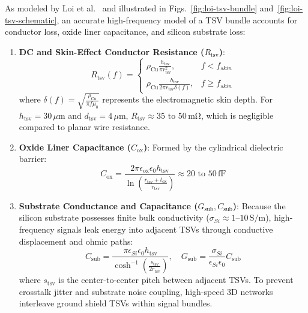 As modeled by Loi et al.~\cite{Loi2011} and illustrated in Figs.~\ref{fig:loi-tsv-bundle} and~\ref{fig:loi-tsv-schematic}, an accurate high-frequency model of a TSV bundle accounts for conductor loss, oxide liner capacitance, and silicon substrate loss:
\begin{enumerate}
    \item \textbf{DC and Skin-Effect Conductor Resistance ($R_{\mathrm{tsv}}$)}:
    \begin{equation}
        R_{\mathrm{tsv}}(f) = 
        \begin{cases}
        \rho_{\mathrm{Cu}} \frac{h_{\mathrm{tsv}}}{\pi r_{\mathrm{tsv}}^2}, & f < f_{skin} \\
        \rho_{\mathrm{Cu}} \frac{h_{\mathrm{tsv}}}{2\pi r_{\mathrm{tsv}} \delta(f)}, & f \ge f_{skin}
        \end{cases}
        \label{eq:tsv-resistance}
    \end{equation}
    where $\delta(f) = \sqrt{\frac{\rho_{\mathrm{Cu}}}{\pi f \mu_0}}$ represents the electromagnetic skin depth. For $h_{\mathrm{tsv}} = 30\,\mu\mathrm{m}$ and $d_{\mathrm{tsv}} = 4\,\mu\mathrm{m}$, $R_{\mathrm{tsv}} \approx 35\text{ to }50\,\mathrm{m\Omega}$, which is negligible compared to planar wire resistance.
    
    \item \textbf{Oxide Liner Capacitance ($C_{\mathrm{ox}}$)}: Formed by the cylindrical dielectric barrier:
    \begin{equation}
        C_{\mathrm{ox}} = \frac{2 \pi \epsilon_{\mathrm{ox}} \epsilon_0 h_{\mathrm{tsv}}}{\ln\left(\frac{r_{\mathrm{tsv}} + t_{\mathrm{ox}}}{r_{\mathrm{tsv}}}\right)} \approx 20\text{ to }50\,\mathrm{fF}
        \label{eq:tsv-capacitance}
    \end{equation}
    
    \item \textbf{Substrate Conductance and Capacitance ($G_{\mathrm{sub}}, C_{\mathrm{sub}}$)}: Because the silicon substrate possesses finite bulk conductivity ($\sigma_{Si} \approx 1\text{--}10\,\text{S/m}$), high-frequency signals leak energy into adjacent TSVs through conductive displacement and ohmic paths:
    \begin{equation}
    C_{\mathrm{sub}} = \frac{\pi \epsilon_{Si} \epsilon_0 h_{\mathrm{tsv}}}{\cosh^{-1}\left(\frac{s_{\mathrm{tsv}}}{2 r_{\mathrm{tsv}}}\right)}, \quad G_{\mathrm{sub}} = \frac{\sigma_{Si}}{\epsilon_{Si} \epsilon_0} C_{\mathrm{sub}}
    \label{eq:tsv_sub_coupling}
    \end{equation}
    where $s_{\mathrm{tsv}}$ is the center-to-center pitch between adjacent TSVs. To prevent crosstalk jitter and substrate noise coupling, high-speed 3D networks interleave ground shield TSVs within signal bundles.
\end{enumerate}

